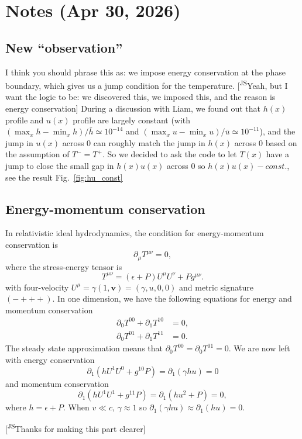 \documentclass[11pt]{article}
\newcommand{\LB}[1]{{\color{brown}#1}}
\newcommand{\JScom}[1]{\textsf{\color{violet} [\textsuperscript{JS}#1]}}
\newcommand{\eps}{\epsilon}
\begin{document}
\newpage

\section{Notes (Apr 30, 2026)}

\subsection{New ``observation''}
\LB{I think you should phrase this as: we impose energy conservation at the phase boundary, which gives us a jump condition for the temperature.}\JScom{Yeah, but I want the logic to be: we discovered this, we imposed this, and the reason is energy conservation} During a discussion with Liam, we found out that $h(x)$ profile and $u(x)$ profile are largely constant (with $(\max_x h - \min_x h)/\bar h\simeq 10^{-14}$ and $(\max_x u - \min_x u)/\bar u\simeq 10^{-11}$), and the jump in $u(x)$ across 0 can roughly match the jump in $h(x)$ across 0 based on the assumption of $T^- = T^+$. So we decided to ask the code to let $T(x)$ have a jump to close the small gap in $h(x)u(x)$ across 0 so $h(x)u(x) - const. $, see the result Fig.~\ref{fig:hu_const}

\LB{\subsection{Energy-momentum conservation}

In relativistic ideal hydrodynamics, the condition for energy-momentum conservation is
\begin{equation}
\partial_\mu T^{\mu\nu}=0,
\end{equation}
where the stress-energy tensor is
\begin{equation}
T^{\mu\nu}=(\epsilon+P)U^\mu U^\nu+P g^{\mu\nu}.
\end{equation}
with four-velocity $U^\mu = \gamma (1, \mathbf{v}) = (\gamma, u, 0, 0)$ and metric signature $(-+++)$.
In one dimension, we have the following equations for energy and momentum conservation
\begin{align}
\partial_0 T^{00}+\partial_1 T^{10}&=0,\\
\partial_0 T^{01}+\partial_1 T^{11}&=0.
\end{align}
The steady state approximation means that $\partial_0 T^{00}=\partial_0 T^{01}=0$. We are now left with energy conservation
\begin{equation}
\partial_1(hU^1U^0+g^{10}P)=\boxed{\partial_1(\gamma hu)=0}
\label{eq:energy_cons}
\end{equation}
and momentum conservation
\begin{equation}
    \partial_1(hU^1U^1+g^{11}P)=\boxed{\partial_1(hu^2+P)=0},
\end{equation}
where $h=\eps+P$.
%
When $v\ll c$, $\gamma \approx 1$ so $\partial_1(\gamma h u)\approx\partial_1(h u)=0$.
} \JScom{Thanks for making this part clearer}
\end{document}

